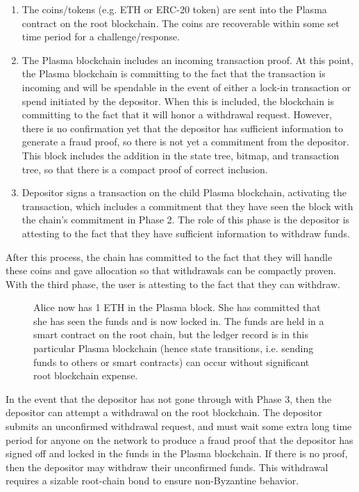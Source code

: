 \documentclass[letterpaper, 11pt]{article}
\begin{document}
\begin{enumerate}
	\item
		The coins/tokens (e.g. ETH or ERC-20 token) are sent into the
		Plasma contract on the root blockchain. The coins are
		recoverable within some set time period for a
		challenge/response.
	\item
		The Plasma blockchain includes an incoming transaction proof. At
		this point, the Plasma blockchain is committing to the fact that
		the transaction is incoming and will be spendable in the event
		of either a lock-in transaction or spend initiated by the
		depositor. When this is included, the blockchain is committing
		to the fact that it will honor a withdrawal request. However,
		there is no confirmation yet that the depositor has sufficient
		information to generate a fraud proof, so there is not yet a
		commitment from the depositor. This block includes the addition
		in the state tree, bitmap, and transaction tree, so that there
		is a compact proof of correct inclusion.
	\item
		Depositor signs a transaction on the child Plasma blockchain,
		activating the transaction, which includes a commitment that
		they have seen the block with the chain's commitment in Phase 2.
		The role of this phase is the depositor is attesting to the fact
		that they have sufficient information to withdraw funds. 
\end{enumerate}

After this process, the chain has committed to the fact that they will handle
these coins and gave allocation so that withdrawals can be compactly proven.
With the third phase, the user is attesting to the fact that they can withdraw.

\begin{figure}[H]
	\caption{
		Alice now has 1 ETH in the Plasma block. She has committed that
		she has seen the funds and is now locked in. The funds are held
		in a smart contract on the root chain, but the ledger record is
		in this particular Plasma blockchain (hence state transitions,
		i.e. sending funds to others or smart contracts) can occur
		without significant root blockchain expense.
		}
\end{figure}

In the event that the depositor has not gone through with Phase 3, then the
depositor can attempt a withdrawal on the root blockchain. The depositor submits
an unconfirmed withdrawal request, and must wait some extra long time period for
anyone on the network to produce a fraud proof that the depositor has signed off
and locked in the funds in the Plasma blockchain. If there is no proof, then the
depositor may withdraw their unconfirmed funds. This withdrawal requires a
sizable root-chain bond to ensure non-Byzantine behavior.
\end{document}
